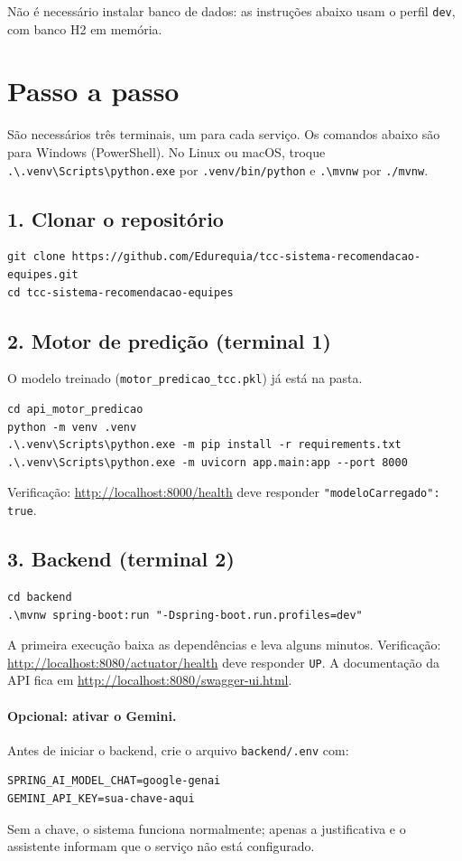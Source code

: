 \documentclass[12pt,a4paper]{article}
\begin{document}
Não é necessário instalar banco de dados: as instruções abaixo usam o perfil \texttt{dev}, com banco H2 em memória.

\section{Passo a passo}

São necessários três terminais, um para cada serviço. Os comandos abaixo são para Windows (PowerShell). No Linux ou macOS, troque \texttt{.\textbackslash.venv\textbackslash Scripts\textbackslash python.exe} por \texttt{.venv/bin/python} e \texttt{.\textbackslash mvnw} por \texttt{./mvnw}.

\subsection*{1. Clonar o repositório}
\begin{lstlisting}
git clone https://github.com/Edurequia/tcc-sistema-recomendacao-equipes.git
cd tcc-sistema-recomendacao-equipes
\end{lstlisting}

\subsection*{2. Motor de predição (terminal 1)}
O modelo treinado (\texttt{motor\_predicao\_tcc.pkl}) já está na pasta.
\begin{lstlisting}
cd api_motor_predicao
python -m venv .venv
.\.venv\Scripts\python.exe -m pip install -r requirements.txt
.\.venv\Scripts\python.exe -m uvicorn app.main:app --port 8000
\end{lstlisting}
Verificação: \url{http://localhost:8000/health} deve responder \texttt{"modeloCarregado": true}.

\subsection*{3. Backend (terminal 2)}
\begin{lstlisting}
cd backend
.\mvnw spring-boot:run "-Dspring-boot.run.profiles=dev"
\end{lstlisting}
A primeira execução baixa as dependências e leva alguns minutos. Verificação: \url{http://localhost:8080/actuator/health} deve responder \texttt{UP}. A documentação da API fica em \url{http://localhost:8080/swagger-ui.html}.

\paragraph{Opcional: ativar o Gemini.} Antes de iniciar o backend, crie o arquivo \texttt{backend/.env} com:
\begin{lstlisting}
SPRING_AI_MODEL_CHAT=google-genai
GEMINI_API_KEY=sua-chave-aqui
\end{lstlisting}
Sem a chave, o sistema funciona normalmente; apenas a justificativa e o assistente informam que o serviço não está configurado.
\end{document}
